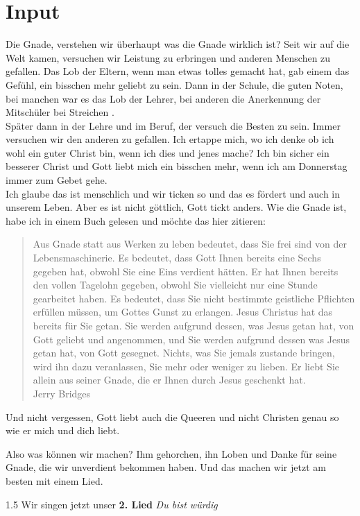 \documentclass{../inc/mybib}
\begin{document}
\section{ Input }
\begin{spacing}{1.5}
Die Gnade, verstehen wir überhaupt was die Gnade wirklich ist? Seit wir auf die Welt kamen, versuchen wir Leistung zu erbringen und anderen Menschen zu gefallen. Das Lob der Eltern, wenn man etwas tolles gemacht hat, gab einem das Gefühl, ein bisschen mehr geliebt zu sein. Dann in der Schule, die guten Noten, bei manchen war es das Lob der Lehrer, bei anderen  die Anerkennung der Mitschüler bei Streichen .\\
Später dann in der Lehre und im Beruf, der versuch die Besten zu sein. Immer versuchen wir den anderen zu gefallen. Ich ertappe mich, wo ich denke ob ich wohl ein guter Christ bin, wenn ich dies und jenes mache? Ich bin sicher ein besserer Christ und Gott liebt mich ein bisschen mehr, wenn ich am Donnerstag immer zum Gebet gehe.\\
Ich glaube das ist menschlich und wir ticken so und das es fördert und auch in unserem Leben. Aber es ist nicht göttlich, Gott tickt anders. Wie die Gnade ist, habe ich in einem Buch gelesen und möchte das hier zitieren:
\begin{quote}
    Aus Gnade statt aus Werken zu leben bedeutet, dass Sie frei sind von der Lebensmaschinerie. Es bedeutet, dass Gott Ihnen bereits eine \glqq Sechs\grqq{} gegeben hat, obwohl Sie eine \glqq Eins\grqq{} verdient hätten. Er hat Ihnen bereits den vollen Tagelohn gegeben, obwohl Sie vielleicht nur eine Stunde gearbeitet haben. Es bedeutet, dass Sie nicht bestimmte geistliche Pflichten erfüllen müssen, um Gottes Gunst zu erlangen. Jesus Christus hat das bereits für Sie getan. Sie werden aufgrund dessen, was Jesus getan hat, von Gott geliebt und angenommen, und Sie werden aufgrund dessen was Jesus getan hat, von Gott gesegnet. Nichts, was Sie jemals zustande bringen, wird ihn dazu veranlassen, Sie mehr oder weniger zu lieben. Er liebt Sie allein aus seiner Gnade, die er Ihnen durch Jesus geschenkt hat.\\
    Jerry Bridges
\end{quote}
Und nicht vergessen, Gott liebt auch die Queeren und nicht Christen genau so wie er mich und dich liebt.

Also was können wir machen? Ihm gehorchen, ihn Loben und Danke für seine Gnade, die wir unverdient bekommen haben. Und das machen wir jetzt am besten mit einem Lied.


\end{spacing}{1.5}
Wir singen jetzt unser \textbf{2. Lied} \textit{Du bist würdig}
\end{document}
